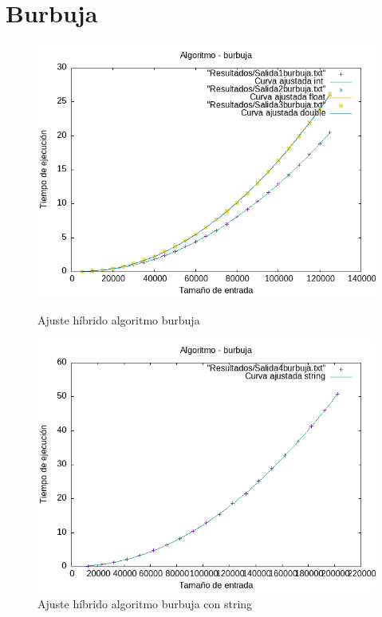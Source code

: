 \documentclass[11pt,openany]{book}
\begin{document}
\section*{Burbuja}
\begin{figure}[H]
    \begin{minipage}{0.5\textwidth}
        \centering
        \includegraphics[width=\linewidth]{assets/AjusteHibrido_latex/Hibridoburbuja/burbuja_hib.png}
        \caption{Ajuste híbrido algoritmo burbuja}
        \label{fig:burbuja}
    \end{minipage}%
    \begin{minipage}{0.5\textwidth}
        \centering
        \includegraphics[width=\linewidth]{assets/AjusteHibrido_latex/Hibridoburbuja/burbujastring_hib.png}
        \caption{Ajuste híbrido algoritmo burbuja con string}
        \label{fig:burbujastring}
    \end{minipage}
\end{figure}
\end{document}
